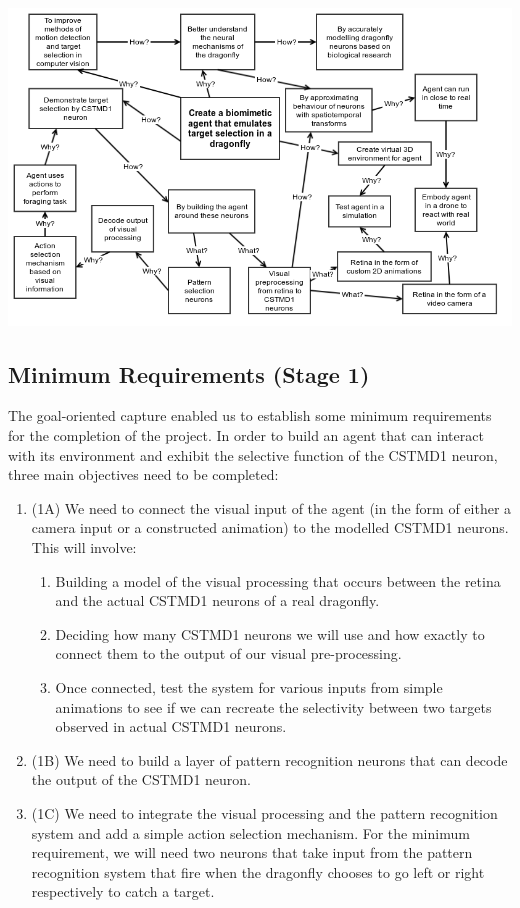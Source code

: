 \documentclass[a4paper,11pt]{article}
\begin{document}
	\begin{center}
	\includegraphics[scale = 0.5]{goalorient}	
	\end{center}

	\subsection{Minimum Requirements (Stage 1)}
	
	The goal-oriented capture enabled us to establish some minimum requirements for the completion of the project. In order to build an agent that can interact with its environment and exhibit the selective function of the CSTMD1 neuron, three main objectives need to be completed:
\begin{enumerate}
	\item (1A) We need to connect the visual input of the agent (in the form 	of either a camera input or a constructed animation) to the modelled CSTMD1 neurons. This will involve:
	\begin{enumerate}
		\item Building a model of the visual processing that occurs between the retina and the actual CSTMD1 neurons of a real dragonfly.
		\item Deciding how many CSTMD1 neurons we will use and how exactly to connect them to the output of our visual pre-processing.
		\item Once connected, test the system for various inputs from simple animations to see if we can recreate the selectivity between two targets observed in actual CSTMD1 neurons. ~\cite{w13}
	\end{enumerate}
	\item (1B) We need to build a layer of pattern recognition neurons that can decode the output of the CSTMD1 neuron.
	\item (1C) We need to integrate the visual processing and the pattern recognition system and add a simple action selection mechanism. For the minimum requirement, we will need two neurons that take input from the pattern recognition system that fire when the dragonfly chooses to go left or right respectively to catch a target.
\end{enumerate} 
 
\end{document}
